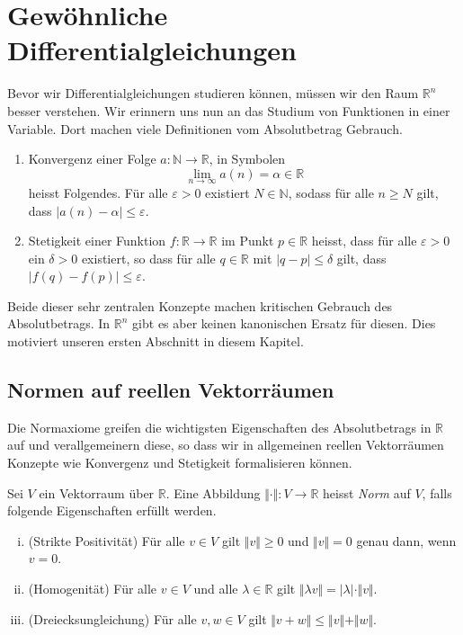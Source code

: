 \documentclass[../main.tex]{subfiles}
\begin{document}
\chapter{Gewöhnliche Differentialgleichungen}\label{chp:odes}
Bevor wir Differentialgleichungen studieren können,
müssen wir den Raum $\mathbb{R}^n$ besser verstehen.
Wir erinnern uns nun an das Studium von Funktionen
in einer Variable.
Dort machen viele Definitionen
vom Absolutbetrag Gebrauch.

\begin{examples}
  \leavevmode
  \begin{enumerate}[(1)]
    \item Konvergenz einer Folge $a \colon \mathbb{N} \to \mathbb{R}$,
      in Symbolen
      \[
        \lim_{n \to \infty} a(n) = \alpha \in \mathbb{R}
      \]
      heisst Folgendes. Für alle $\varepsilon > 0$ existiert
      $N \in \mathbb{N}$, sodass für alle $n \geq N$ 
      gilt, dass $|a(n) - \alpha| \leq \varepsilon$.
    \item Stetigkeit einer Funktion $f \colon \mathbb{R} \to \mathbb{R}$ 
      im Punkt $p\in \mathbb{R}$ heisst, dass für alle $\varepsilon > 0$ 
      ein $\delta > 0$ existiert, so dass
      für alle $q \in \mathbb{R}$ mit $|q - p| \leq \delta$ gilt,
      dass $|f(q) - f(p)| \leq \varepsilon$.
  \end{enumerate}
\end{examples}

Beide dieser sehr zentralen Konzepte machen kritischen Gebrauch
des Absolutbetrags.
In $\mathbb{R}^n$ gibt es aber keinen kanonischen Ersatz für diesen.
Dies motiviert unseren ersten Abschnitt in diesem Kapitel.

\section{Normen auf reellen Vektorräumen}
Die Normaxiome greifen die wichtigsten Eigenschaften des
Absolutbetrags in $\mathbb{R}$ auf und verallgemeinern
diese, so dass wir in allgemeinen reellen Vektorräumen
Konzepte wie Konvergenz und Stetigkeit formalisieren können.

\begin{definition}
  Sei $V$ ein Vektorraum über $\mathbb{R}$.
  Eine Abbildung $\Vert \cdot \Vert \colon V \to \mathbb{R}$
  heisst \emph{Norm} auf $V$, falls folgende Eigenschaften erfüllt werden.
  \begin{enumerate}[(i)]
    \item (Strikte Positivität)
      Für alle $v \in V$ gilt $\Vert v \Vert \geq 0$ und
      $\Vert v \Vert = 0$ genau dann, wenn $v = 0$.
    \item (Homogenität)
      Für alle $v \in V$ und alle $\lambda \in \mathbb{R}$ gilt
      $\Vert \lambda v \Vert = |\lambda| \cdot \Vert v \Vert$.
    \item (Dreiecksungleichung)
      Für alle $v, w \in V$ gilt $\Vert v + w \Vert \leq \Vert v \Vert
      + \Vert w \Vert$.
  \end{enumerate}
\end{definition}
\end{document}
